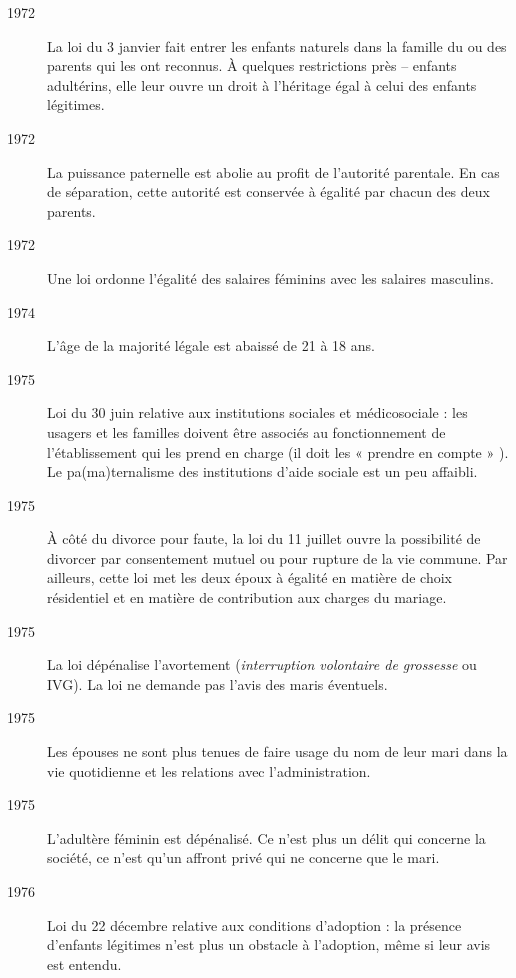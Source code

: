 \begin{description}
\item[1972] La loi du 3 janvier fait entrer les enfants naturels dans la famille du ou des parents qui les ont reconnus. À quelques restrictions près -- enfants adultérins, elle leur ouvre un droit à l'héritage égal à celui des enfants légitimes.

\item[1972] 
La puissance paternelle est abolie au profit de l'autorité parentale. En cas de séparation, cette autorité est conservée à égalité par chacun des deux parents. 

\item[1972] 
Une loi ordonne l'égalité des salaires féminins avec les salaires masculins.

\item[1974] L'âge de la majorité légale est abaissé de 21 à 18 ans. 

\item[1975] Loi du 30 juin relative aux institutions sociales et médicosociale : les usagers et les familles doivent être associés au fonctionnement de l'établissement qui les prend en charge (il doit les « prendre en compte » ).  Le pa(ma)ternalisme des institutions d'aide sociale est un peu affaibli.

\item[1975] 
À côté du divorce pour faute, la loi du 11 juillet ouvre la possibilité de divorcer par consentement mutuel ou pour rupture de la vie commune. Par ailleurs, cette loi met les deux époux à égalité en matière de choix résidentiel et en matière de contribution aux charges du mariage.

\item[1975] 
La loi  dépénalise l'avortement (\emph{interruption volontaire de grossesse} ou IVG). La loi ne demande pas l'avis des maris éventuels.

\item[1975] 
Les épouses ne sont plus tenues de faire usage du nom de leur mari dans la vie quotidienne et les relations avec l'administration.

\item[1975] 
L'adultère féminin est dépénalisé. Ce n'est plus un délit qui concerne la société, ce n'est qu'un affront privé qui ne concerne que le mari.

\item[1976] Loi du 22 décembre relative aux conditions d'adoption : la présence d'enfants légitimes n'est plus un obstacle à l'adoption, même si leur avis est entendu. 


\end{description}
